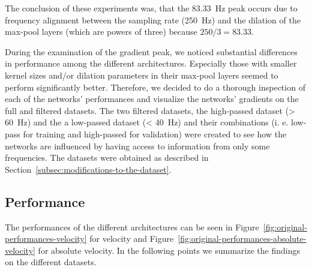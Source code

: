 The conclusion of these experiments was, that the 83.33~Hz peak occurs due to frequency alignment between the sampling rate (250~Hz) and the dilation of the max-pool layers (which are powers of three) because $ 250/3 = 83.33$. 

During the examination of the gradient peak, we noticed substantial differences in performance among the different architectures.
Especially those with smaller kernel sizes and/or dilation parameters in their max-pool layers seemed to perform significantly better.
Therefore, we decided to do a thorough inspection of each of the networks' performances and visualize the networks' gradients on the full and filtered datasets. 
The two filtered datasets, the high-passed dataset (> 60~Hz) and the a low-passed dataset (< 40~Hz) and their combinations (i. e. low-pass for training and high-passed for validation) were created to see how the networks are influenced by having access to information from only some frequencies. The datasets were obtained as described in Section~\ref{subsec:modifications-to-the-dataset}.

\subsection{Performance}\label{subsec:performance}
The performances of the different architectures can be seen in Figure~\ref{fig:original-performances-velocity} for velocity and Figure~\ref{fig:original-performances-absolute-velocity} for absolute velocity.
In the following points we summarize the findings on the different datasets.


